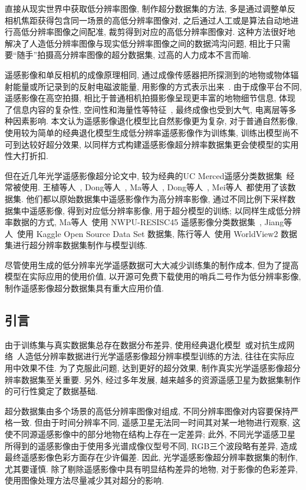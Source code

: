 直接从现实世界中获取低分辨率图像, 制作超分数据集的方法, 多是通过调整单反相机焦距获得包含同一场景的高低分辨率图像对, 之后通过人工或是算法自动地进行高低分辨率图像之间配准, 裁剪得到对应的高低分辨率图像对. 这种方法很好地解决了人造低分辨率图像与现实低分辨率图像之间的数据鸿沟问题, 相比于只需要``随手''拍摄高分辨率图像的超分数据集, 过高的人力成本不言而喻. 

遥感影像和单反相机的成像原理相同, 通过成像传感器把所探测到的地物或物体辐射能量或所记录到的反射电磁波能量, 用影像的方式表示出来~\cite{RSbook01}. 由于成像平台不同, 遥感影像在高空拍摄, 相比于普通相机拍摄影像呈现更丰富的地物细节信息, 体现了信息内容的复杂性, 空间性和海量性等特征~\cite{RSfeature01}, 最终成像也受到大气, 电离层等多种因素影响. 本文认为遥感影像退化模型比自然影像更为复杂, 对于普通自然影像, 使用较为简单的经典退化模型生成低分辨率遥感影像作为训练集, 训练出模型尚不可到达较好超分效果, 以同样方式构建遥感影像超分辨率数据集更会使模型的实用性大打折扣.

但在近几年光学遥感影像超分论文中, 较为经典的UC Merced遥感分类数据集~\cite{UC-Merced}经常被使用. 王植等人~\cite{rssrbad02}, Dong等人~\cite{rssrbad05}, Ma等人~\cite{rssrbad06}, Dong等人~\cite{rssrbad07}, Mei等人~\cite{rssrbad08}都使用了该数据集. 他们都以原始数据集中遥感影像作为高分辨率影像, 通过不同比例下采样数据集中遥感影像, 得到对应低分辨率影像, 用于超分模型的训练; 以同样生成低分辨率数据的方式, Ma等人~\cite{rssrbad01}使用 NWPU-RESISC45 遥感影像分类数据集~\cite{NWPU-RESISC45}, Jiang等人~\cite{rssrbad03}使用 Kaggle Open Source Data Set 数据集, 陈行等人~\cite{rssrbad04}使用 WorldView2 数据集进行超分辨率数据集制作与模型训练. 

尽管使用生成的低分辨率光学遥感数据可大大减少训练集的制作成本, 但为了提高模型在实际应用的使用价值, 以开源可免费下载使用的哨兵二号作为低分辨率影像, 制作遥感影像超分数据集具有重大应用价值. 

\subsection{引言}
由于训练集与真实数据集总存在数据分布差异, 使用经典退化模型~\cite{classicDM}或对抗生成网络~\cite{GAN}人造低分辨率数据进行光学遥感影像超分辨率模型训练的方法, 往往在实际应用中效果不佳. 为了克服此问题, 达到更好的超分效果, 制作真实光学遥感影像超分辨率数据集至关重要. 另外, 经过多年发展, 越来越多的资源遥感卫星为数据集制作的可行性奠定了数据基础.

超分数据集由多个场景的高低分辨率图像对组成, 不同分辨率图像对内容要保持严格一致. 但由于时间分辨率不同, 遥感卫星无法同一时间其对某一地物进行观察, 这使不同源遥感影像中的部分地物在结构上存在一定差异; 此外, 不同光学遥感卫星所得到的遥感影像由于使用多光谱成像仪型号不同, RGB三个波段略有差异, 造成最终遥感影像色彩方面存在少许偏差. 因此, 光学遥感影像超分辨率数据集的制作, 尤其要谨慎. 除了剔除遥感影像中具有明显结构差异的地物, 对于影像的色彩差异, 使用图像处理方法尽量减少其对超分的影响. 

